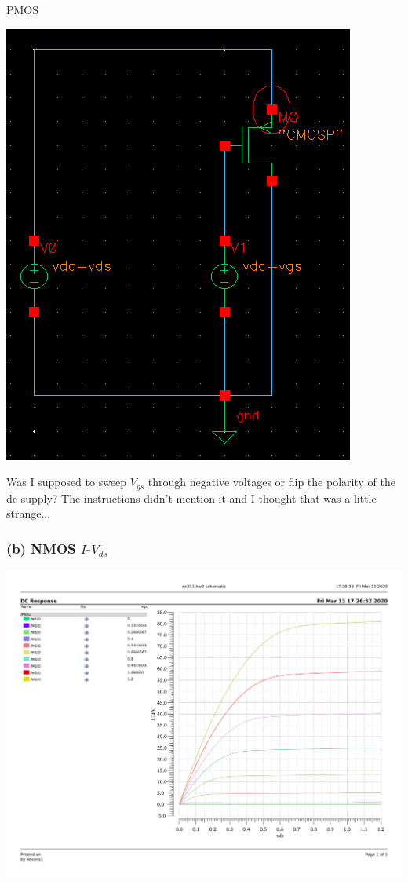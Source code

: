 \documentclass{homework}
\begin{document}
	\begin{minipage}[t]{0.5\linewidth}
	\centering PMOS
	
	\noindent\includegraphics[width=1\linewidth]{hw2pmos}
	
	\raggedright
	Was I supposed to sweep $V_{gs}$ through negative voltages or flip the polarity of the dc supply? The instructions didn't mention it and I thought that was a little strange...
	\end{minipage}
	\pagebreak
	\subsubsection*{(b) NMOS $I$-$V_{ds}$}	
	\includegraphics[width=1\linewidth]{nmos}
	
\end{document}
